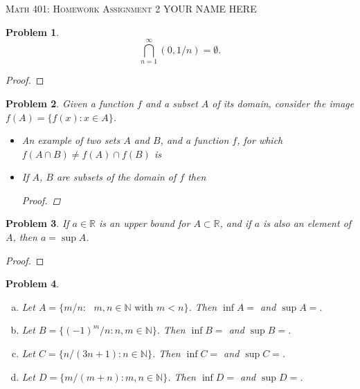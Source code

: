 \documentclass[12pt]{article}
\newtheorem{problem}{Problem}
\newcommand{\RR}{\ensuremath{\mathbb R}}
\newcommand{\NN}{\ensuremath{\mathbb N}}
\begin{document}
\small
\noindent \textsc{Math 401: Homework Assignment 2} \hfill YOUR NAME HERE

\normalsize
\bigskip

\setcounter{problem}{5}



\begin{problem} %
    $$\bigcap_{n=1}^\infty (0,1/n)=\emptyset.$$
\end{problem}


\begin{proof}
\end{proof}


\begin{problem} %
Given a function $f$ and a subset $A$ of its domain, consider the image $f(A) = \{f(x) : x \in A\}$.

\begin{itemize}
\item[(a)] An example of two sets $A$ and $B$, and a function $f$, for which $f(A \cap B) \neq f(A) \cap f(B)$ is


\item[(b)] If $A$, $B$ are subsets of the domain of $f$ then


\begin{proof}
\end{proof}
\end{itemize}
\end{problem}


\begin{problem} %
If $a\in\RR$ is an upper bound for $A\subset \RR$, and if $a$ is also an element of $A$, then $a = \sup A$.
\end{problem}

\begin{proof}
\end{proof}


\begin{problem} %
\begin{enumerate}[(a)]
\item Let $A=\{m/n: \text{ $m,n\in\NN$ with $m<n$} \}$.  Then $\inf A = $ and $\sup A = $.
\item Let $B=\{(-1)^m/n: n,m\in\NN\}$.  Then $\inf B = $ and $\sup B = $.
\item Let $C=\{n/(3n+1): n\in\NN\}$.  Then $\inf C = $ and $\sup C = $.
\item Let $D=\{m/(m+n):m,n\in\NN\}$.  Then $\inf D = $ and $\sup D = $.
\end{enumerate}
\end{problem}

\end{document}
